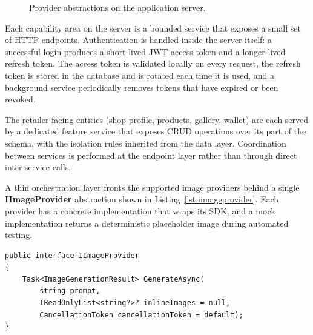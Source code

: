 \begin{figure}[!ht]
{%
}
\caption{Provider abstractions on the application server.}
\label{fig:semantic-kernel}
\end{figure}

\label{subsec:capabilities}
Each capability area on the server is a bounded service that exposes a small set of HTTP endpoints. Authentication is handled inside the server itself: a successful login produces a short-lived JWT access token and a longer-lived refresh token. The access token is validated locally on every request, the refresh token is stored in the database and is rotated each time it is used, and a background service periodically removes tokens that have expired or been revoked.

The retailer-facing entities (shop profile, products, gallery, wallet) are each served by a dedicated feature service that exposes CRUD operations over its part of the schema, with the isolation rules inherited from the data layer. Coordination between services is performed at the endpoint layer rather than through direct inter-service calls.

A thin orchestration layer fronts the supported image providers behind a single \textbf{IImageProvider} abstraction shown in Listing~\ref{lst:iimageprovider}. Each provider has a concrete implementation that wraps its SDK, and a mock implementation returns a deterministic placeholder image during automated testing.

\begin{lstlisting}[style=csharp, caption={The IImageProvider abstraction.}, label={lst:iimageprovider}]
public interface IImageProvider
{
    Task<ImageGenerationResult> GenerateAsync(
        string prompt,
        IReadOnlyList<string?>? inlineImages = null,
        CancellationToken cancellationToken = default);
}
\end{lstlisting}

